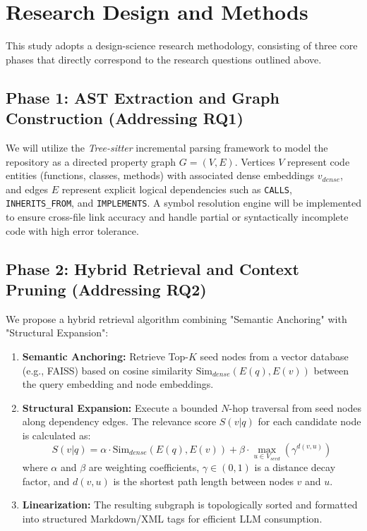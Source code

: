 \documentclass[11pt, a4paper]{article}
\begin{document}
\section{Research Design and Methods}
This study adopts a design-science research methodology, consisting of three core phases that directly correspond to the research questions outlined above.

\subsection{Phase 1: AST Extraction and Graph Construction (Addressing RQ1)}
We will utilize the \textit{Tree-sitter} incremental parsing framework to model the repository as a directed property graph $G = (V, E)$. Vertices $V$ represent code entities (functions, classes, methods) with associated dense embeddings $v_{dense}$, and edges $E$ represent explicit logical dependencies such as \texttt{CALLS}, \texttt{INHERITS\_FROM}, and \texttt{IMPLEMENTS}. A symbol resolution engine will be implemented to ensure cross-file link accuracy and handle partial or syntactically incomplete code with high error tolerance.

\subsection{Phase 2: Hybrid Retrieval and Context Pruning (Addressing RQ2)}
We propose a hybrid retrieval algorithm combining "Semantic Anchoring" with "Structural Expansion":

\begin{enumerate}
    \item \textbf{Semantic Anchoring:} Retrieve Top-$K$ seed nodes from a vector database (e.g., FAISS) based on cosine similarity $\text{Sim}_{dense}(E(q), E(v))$ between the query embedding and node embeddings.
    \item \textbf{Structural Expansion:} Execute a bounded $N$-hop traversal from seed nodes along dependency edges. The relevance score $S(v|q)$ for each candidate node is calculated as:
    \[ S(v|q) = \alpha \cdot \text{Sim}_{dense}(E(q), E(v)) + \beta \cdot \max_{u \in V_{seed}} (\gamma^{d(v, u)}) \]
    where $\alpha$ and $\beta$ are weighting coefficients, $\gamma \in (0,1)$ is a distance decay factor, and $d(v, u)$ is the shortest path length between nodes $v$ and $u$.
    \item \textbf{Linearization:} The resulting subgraph is topologically sorted and formatted into structured Markdown/XML tags for efficient LLM consumption.
\end{enumerate}
\end{document}
